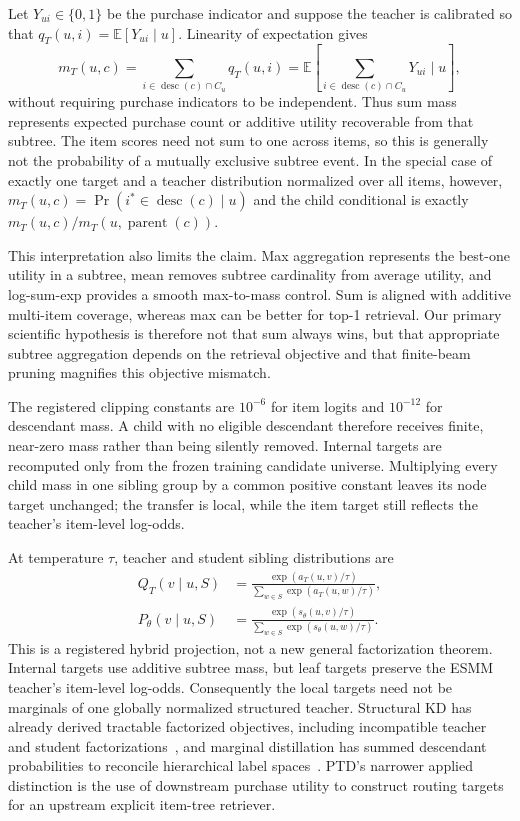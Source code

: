 \documentclass[sigconf,natbib=true]{acmart}
\newcommand{\ptd}{\textsc{PTD}}
\begin{document}
Let $Y_{ui}\in\{0,1\}$ be the purchase indicator and suppose the teacher is calibrated so that $q_T(u,i)=\mathbb{E}[Y_{ui}\mid u]$. Linearity of expectation gives
\begin{equation}
m_T(u,c)=\sum_{i\in\operatorname{desc}(c)\cap C_u}q_T(u,i)
=\mathbb{E}\!\left[\sum_{i\in\operatorname{desc}(c)\cap C_u}Y_{ui}\mid u\right],
\label{eq:expected-mass}
\end{equation}
without requiring purchase indicators to be independent. Thus sum mass represents expected purchase count or additive utility recoverable from that subtree. The item scores need not sum to one across items, so this is generally not the probability of a mutually exclusive subtree event. In the special case of exactly one target and a teacher distribution normalized over all items, however, $m_T(u,c)=\Pr(i^*\in\operatorname{desc}(c)\mid u)$ and the child conditional is exactly $m_T(u,c)/m_T(u,\operatorname{parent}(c))$.

This interpretation also limits the claim. Max aggregation represents the best-one utility in a subtree, mean removes subtree cardinality from average utility, and log-sum-exp provides a smooth max-to-mass control. Sum is aligned with additive multi-item coverage, whereas max can be better for top-1 retrieval. Our primary scientific hypothesis is therefore not that sum always wins, but that appropriate subtree aggregation depends on the retrieval objective and that finite-beam pruning magnifies this objective mismatch.

The registered clipping constants are $10^{-6}$ for item logits and $10^{-12}$ for descendant mass. A child with no eligible descendant therefore receives finite, near-zero mass rather than being silently removed. Internal targets are recomputed only from the frozen training candidate universe. Multiplying every child mass in one sibling group by a common positive constant leaves its node target unchanged; the transfer is local, while the item target still reflects the teacher's item-level log-odds.

At temperature $\tau$, teacher and student sibling distributions are
\begin{align}
Q_T(v\mid u,S)&=\frac{\exp(a_T(u,v)/\tau)}{\sum_{w\in S}\exp(a_T(u,w)/\tau)},\\
P_\theta(v\mid u,S)&=\frac{\exp(s_\theta(u,v)/\tau)}{\sum_{w\in S}\exp(s_\theta(u,w)/\tau)}.
\end{align}
This is a registered hybrid projection, not a new general factorization theorem. Internal targets use additive subtree mass, but leaf targets preserve the ESMM teacher's item-level log-odds. Consequently the local targets need not be marginals of one globally normalized structured teacher. Structural KD has already derived tractable factorized objectives, including incompatible teacher and student factorizations~\citep{wang2021structural}, and marginal distillation has summed descendant probabilities to reconcile hierarchical label spaces~\citep{asapp2022marginal}. \ptd's narrower applied distinction is the use of downstream purchase utility to construct routing targets for an upstream explicit item-tree retriever.
\end{document}
